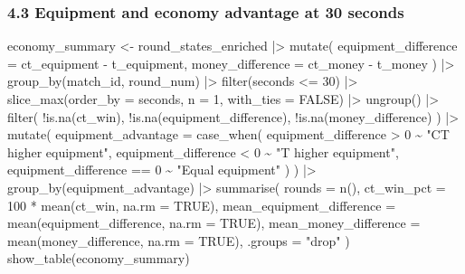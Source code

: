 \documentclass[
  letterpaper,
  DIV=11,
  numbers=noendperiod]{scrartcl}
\newenvironment{Shaded}{\begin{snugshade}}{\end{snugshade}}
\newcommand{\AttributeTok}[1]{\textcolor[rgb]{0.40,0.45,0.13}{#1}}
\newcommand{\ConstantTok}[1]{\textcolor[rgb]{0.56,0.35,0.01}{#1}}
\newcommand{\DecValTok}[1]{\textcolor[rgb]{0.68,0.00,0.00}{#1}}
\newcommand{\FunctionTok}[1]{\textcolor[rgb]{0.28,0.35,0.67}{#1}}
\newcommand{\NormalTok}[1]{\textcolor[rgb]{0.00,0.23,0.31}{#1}}
\newcommand{\OtherTok}[1]{\textcolor[rgb]{0.00,0.23,0.31}{#1}}
\newcommand{\SpecialCharTok}[1]{\textcolor[rgb]{0.37,0.37,0.37}{#1}}
\newcommand{\StringTok}[1]{\textcolor[rgb]{0.13,0.47,0.30}{#1}}
\begin{document}
\subsubsection{4.3 Equipment and economy advantage at 30
seconds}\label{equipment-and-economy-advantage-at-30-seconds}

\begin{Shaded}
\begin{Highlighting}[]
\NormalTok{economy\_summary }\OtherTok{\textless{}{-}}\NormalTok{ round\_states\_enriched }\SpecialCharTok{|\textgreater{}}
  \FunctionTok{mutate}\NormalTok{(}
    \AttributeTok{equipment\_difference =}\NormalTok{ ct\_equipment }\SpecialCharTok{{-}}\NormalTok{ t\_equipment,}
    \AttributeTok{money\_difference =}\NormalTok{ ct\_money }\SpecialCharTok{{-}}\NormalTok{ t\_money}
\NormalTok{  ) }\SpecialCharTok{|\textgreater{}}
  \FunctionTok{group\_by}\NormalTok{(match\_id, round\_num) }\SpecialCharTok{|\textgreater{}}
  \FunctionTok{filter}\NormalTok{(seconds }\SpecialCharTok{\textless{}=} \DecValTok{30}\NormalTok{) }\SpecialCharTok{|\textgreater{}}
  \FunctionTok{slice\_max}\NormalTok{(}\AttributeTok{order\_by =}\NormalTok{ seconds, }\AttributeTok{n =} \DecValTok{1}\NormalTok{, }\AttributeTok{with\_ties =} \ConstantTok{FALSE}\NormalTok{) }\SpecialCharTok{|\textgreater{}}
  \FunctionTok{ungroup}\NormalTok{() }\SpecialCharTok{|\textgreater{}}
  \FunctionTok{filter}\NormalTok{(}
    \SpecialCharTok{!}\FunctionTok{is.na}\NormalTok{(ct\_win),}
    \SpecialCharTok{!}\FunctionTok{is.na}\NormalTok{(equipment\_difference),}
    \SpecialCharTok{!}\FunctionTok{is.na}\NormalTok{(money\_difference)}
\NormalTok{  ) }\SpecialCharTok{|\textgreater{}}
  \FunctionTok{mutate}\NormalTok{(}
    \AttributeTok{equipment\_advantage =} \FunctionTok{case\_when}\NormalTok{(}
\NormalTok{      equipment\_difference }\SpecialCharTok{\textgreater{}} \DecValTok{0} \SpecialCharTok{\textasciitilde{}} \StringTok{"CT higher equipment"}\NormalTok{,}
\NormalTok{      equipment\_difference }\SpecialCharTok{\textless{}} \DecValTok{0} \SpecialCharTok{\textasciitilde{}} \StringTok{"T higher equipment"}\NormalTok{,}
\NormalTok{      equipment\_difference }\SpecialCharTok{==} \DecValTok{0} \SpecialCharTok{\textasciitilde{}} \StringTok{"Equal equipment"}
\NormalTok{    )}
\NormalTok{  ) }\SpecialCharTok{|\textgreater{}}
  \FunctionTok{group\_by}\NormalTok{(equipment\_advantage) }\SpecialCharTok{|\textgreater{}}
  \FunctionTok{summarise}\NormalTok{(}
    \AttributeTok{rounds =} \FunctionTok{n}\NormalTok{(),}
    \AttributeTok{ct\_win\_pct =} \DecValTok{100} \SpecialCharTok{*} \FunctionTok{mean}\NormalTok{(ct\_win, }\AttributeTok{na.rm =} \ConstantTok{TRUE}\NormalTok{),}
    \AttributeTok{mean\_equipment\_difference =} \FunctionTok{mean}\NormalTok{(equipment\_difference, }\AttributeTok{na.rm =} \ConstantTok{TRUE}\NormalTok{),}
    \AttributeTok{mean\_money\_difference =} \FunctionTok{mean}\NormalTok{(money\_difference, }\AttributeTok{na.rm =} \ConstantTok{TRUE}\NormalTok{),}
    \AttributeTok{.groups =} \StringTok{"drop"}
\NormalTok{  )}
\FunctionTok{show\_table}\NormalTok{(economy\_summary)}
\end{Highlighting}
\end{Shaded}
\end{document}
